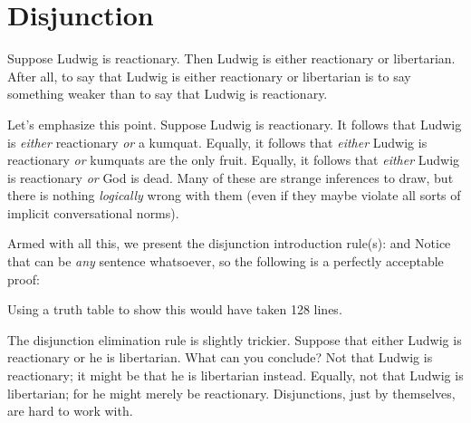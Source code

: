 \section{Disjunction}
Suppose Ludwig is reactionary. Then Ludwig is either reactionary or libertarian. After all, to say that Ludwig is either reactionary or libertarian is to say something weaker than to say that Ludwig is reactionary.

Let's emphasize this point. Suppose Ludwig is reactionary. It follows that Ludwig is \emph{either} reactionary \emph{or} a kumquat. Equally, it follows that \emph{either} Ludwig is reactionary \emph{or} kumquats are the only fruit.  Equally, it follows that \emph{either} Ludwig is reactionary \emph{or}  God is dead. Many of these are strange inferences to draw, but there is nothing \emph{logically} wrong with them (even if they maybe violate all sorts of implicit conversational norms).

Armed with all this, we present the disjunction introduction rule(s):
and
Notice that  can be \emph{any} sentence whatsoever, so the following is a perfectly acceptable proof:
\begin{fitchproof}
\end{fitchproof}
Using a truth table to show this would have taken 128 lines.

The disjunction elimination rule is slightly trickier. Suppose that either Ludwig is reactionary or he is libertarian. What can you conclude? Not that Ludwig is reactionary; it might be that he is libertarian instead. Equally, not that Ludwig is libertarian; for he might merely be reactionary. Disjunctions, just by themselves, are hard to work with.

